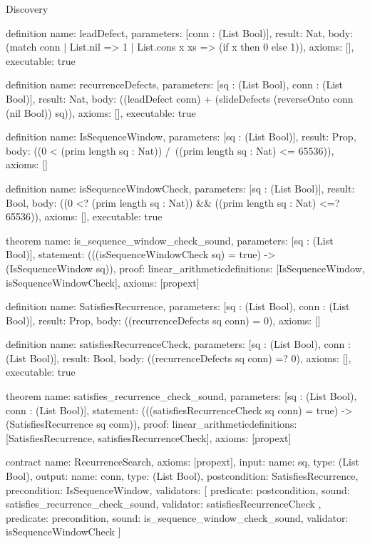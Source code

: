 \begin{lexlean}{Discovery}
\begin{semanticmodule}
definition{
  name: leadDefect,
  parameters: [conn : (List Bool)],
  result: Nat,
  body: (match conn
    | List.nil => 1
    | List.cons x xs => (if x then 0 else 1)),
  axioms: [],
  executable: true
}

definition{
  name: recurrenceDefects,
  parameters: [sq : (List Bool), conn : (List Bool)],
  result: Nat,
  body: ((leadDefect conn) + (slideDefects (reverseOnto conn (nil Bool)) sq)),
  axioms: [],
  executable: true
}

definition{
  name: IsSequenceWindow,
  parameters: [sq : (List Bool)],
  result: Prop,
  body: ((0 < (prim length sq : Nat)) /\ ((prim length sq : Nat) <= 65536)),
  axioms: []
}

definition{
  name: isSequenceWindowCheck,
  parameters: [sq : (List Bool)],
  result: Bool,
  body: ((0 <? (prim length sq : Nat)) && ((prim length sq : Nat) <=? 65536)),
  axioms: [],
  executable: true
}

theorem{
  name: is_sequence_window_check_sound,
  parameters: [sq : (List Bool)],
  statement: (((isSequenceWindowCheck sq) = true) -> (IsSequenceWindow sq)),
  proof: linear_arithmetic{definitions: [IsSequenceWindow, isSequenceWindowCheck]},
  axioms: [propext]
}

definition{
  name: SatisfiesRecurrence,
  parameters: [sq : (List Bool), conn : (List Bool)],
  result: Prop,
  body: ((recurrenceDefects sq conn) = 0),
  axioms: []
}

definition{
  name: satisfiesRecurrenceCheck,
  parameters: [sq : (List Bool), conn : (List Bool)],
  result: Bool,
  body: ((recurrenceDefects sq conn) =? 0),
  axioms: [],
  executable: true
}

theorem{
  name: satisfies_recurrence_check_sound,
  parameters: [sq : (List Bool), conn : (List Bool)],
  statement: (((satisfiesRecurrenceCheck sq conn) = true) -> (SatisfiesRecurrence sq conn)),
  proof: linear_arithmetic{definitions: [SatisfiesRecurrence, satisfiesRecurrenceCheck]},
  axioms: [propext]
}

contract{
  name: RecurrenceSearch,
  axioms: [propext],
  input: {name: sq, type: (List Bool)},
  output: {name: conn, type: (List Bool)},
  postcondition: SatisfiesRecurrence,
  precondition: IsSequenceWindow,
  validators: [
    {
      predicate: postcondition,
      sound: satisfies_recurrence_check_sound,
      validator: satisfiesRecurrenceCheck
    },
    {
      predicate: precondition,
      sound: is_sequence_window_check_sound,
      validator: isSequenceWindowCheck
    }
  ]
}


\end{semanticmodule}
\end{lexlean}
